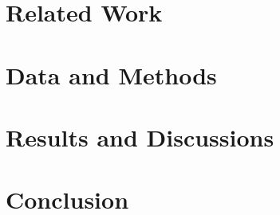 \documentclass[12pt]{article}
\begin{document}
\section{Related Work}
\newpage

\section{Data and Methods}  
\newpage


\section{Results and Discussions}  
\newpage
  

\section{Conclusion}  
\newpage
  
%




 












\end{document}

